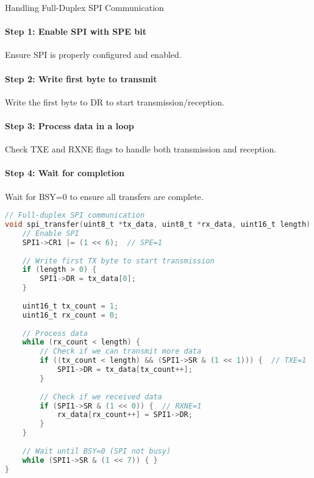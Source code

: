 \begin{KR}{Handling Full-Duplex SPI Communication}
\paragraph{Step 1: Enable SPI with SPE bit}
Ensure SPI is properly configured and enabled.
\paragraph{Step 2: Write first byte to transmit}
Write the first byte to DR to start transmission/reception.
\paragraph{Step 3: Process data in a loop}
Check TXE and RXNE flags to handle both transmission and reception.
\paragraph{Step 4: Wait for completion}
Wait for BSY=0 to ensure all transfers are complete.

\begin{lstlisting}[language=C, style=basesmol]
// Full-duplex SPI communication
void spi_transfer(uint8_t *tx_data, uint8_t *rx_data, uint16_t length) {
    // Enable SPI
    SPI1->CR1 |= (1 << 6);  // SPE=1
    
    // Write first TX byte to start transmission
    if (length > 0) {
        SPI1->DR = tx_data[0];
    }
    
    uint16_t tx_count = 1;
    uint16_t rx_count = 0;
    
    // Process data
    while (rx_count < length) {
        // Check if we can transmit more data
        if ((tx_count < length) && (SPI1->SR & (1 << 1))) {  // TXE=1
            SPI1->DR = tx_data[tx_count++];
        }
        
        // Check if we received data
        if (SPI1->SR & (1 << 0)) {  // RXNE=1
            rx_data[rx_count++] = SPI1->DR;
        }
    }
    
    // Wait until BSY=0 (SPI not busy)
    while (SPI1->SR & (1 << 7)) { }
}
\end{lstlisting}
\end{KR}

